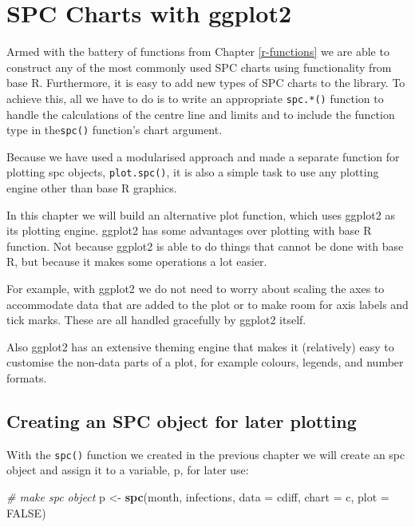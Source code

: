 \documentclass[
]{book}
\newenvironment{Shaded}{\begin{snugshade}}{\end{snugshade}}
\newcommand{\AttributeTok}[1]{\textcolor[rgb]{0.13,0.29,0.53}{#1}}
\newcommand{\CommentTok}[1]{\textcolor[rgb]{0.56,0.35,0.01}{\textit{#1}}}
\newcommand{\ConstantTok}[1]{\textcolor[rgb]{0.56,0.35,0.01}{#1}}
\newcommand{\FunctionTok}[1]{\textcolor[rgb]{0.13,0.29,0.53}{\textbf{#1}}}
\newcommand{\NormalTok}[1]{#1}
\newcommand{\OtherTok}[1]{\textcolor[rgb]{0.56,0.35,0.01}{#1}}
\newcommand{\StringTok}[1]{\textcolor[rgb]{0.31,0.60,0.02}{#1}}
\begin{document}
\chapter{SPC Charts with ggplot2}\label{ggplot}

Armed with the battery of functions from Chapter \ref{r-functions} we are able to construct any of the most commonly used SPC charts using functionality from base R. Furthermore, it is easy to add new types of SPC charts to the library. To achieve this, all we have to do is to write an appropriate \texttt{spc.*()} function to handle the calculations of the centre line and limits and to include the function type in the\texttt{spc()} function's chart argument.

Because we have used a modularised approach and made a separate function for plotting spc objects, \texttt{plot.spc()}, it is also a simple task to use any plotting engine other than base R graphics.

In this chapter we will build an alternative plot function, which uses ggplot2 as its plotting engine. ggplot2 has some advantages over plotting with base R function. Not because ggplot2 is able to do things that cannot be done with base R, but because it makes some operations a lot easier.

For example, with ggplot2 we do not need to worry about scaling the axes to accommodate data that are added to the plot or to make room for axis labels and tick marks. These are all handled gracefully by ggplot2 itself.

Also ggplot2 has an extensive theming engine that makes it (relatively) easy to customise the non-data parts of a plot, for example colours, legends, and number formats.

\section{Creating an SPC object for later plotting}\label{creating-an-spc-object-for-later-plotting}

With the \texttt{spc()} function we created in the previous chapter we will create an spc object and assign it to a variable, p, for later use:

\begin{Shaded}
\begin{Highlighting}[]
\CommentTok{\# make spc object}
\NormalTok{p }\OtherTok{\textless{}{-}} \FunctionTok{spc}\NormalTok{(month, infections,}
         \AttributeTok{data  =}\NormalTok{ cdiff,}
         \AttributeTok{chart =} \StringTok{\textquotesingle{}c\textquotesingle{}}\NormalTok{,}
         \AttributeTok{plot  =} \ConstantTok{FALSE}\NormalTok{)}
\end{Highlighting}
\end{Shaded}
\end{document}
